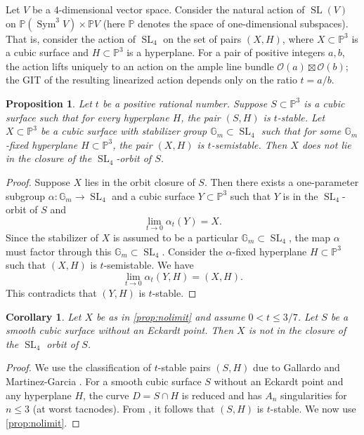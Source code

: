 \documentclass[12 pt]{amsart}
\newtheorem{proposition}{Proposition}[section]
\newtheorem{corollary}{Corollary}[section]
\renewcommand{\P}{\mathbb{P}}
\newcommand{\SL}{\operatorname{SL}}
\newcommand{\<}{\left\langle}
\renewcommand{\>}{\right\rangle}
\DeclareMathOperator{\sym}{Sym}
\begin{document}
Let $V$ be a 4-dimensional vector space.
Consider the natural action of $\SL(V)$ on $\P(\sym^3V) \times \P V$ (here $\P$ denotes the space of one-dimensional subspaces).
That is, consider the action of $\SL_4$ on the set of pairs $(X, H)$, where $X \subset \P^3$ is a cubic surface and $H \subset \P^3$ is a hyperplane.
For a pair of positive integers $a, b$, the action lifts uniquely to an action on the ample line bundle $\mathcal O(a)\boxtimes \mathcal O(b)$; the GIT of the resulting linearized action depends only on the ratio $t = a/b$.

\begin{proposition}\label{prop:nolimit}
  Let $t$ be a positive rational number.
  Suppose $S \subset \P^3$ is a cubic surface such that for every hyperplane $H$, the pair $(S,H)$ is $t$-stable.
  Let $X \subset \P^3$ be a cubic surface with stabilizer group $\mathbb G_m \subset \SL_4$ such that for some $\mathbb G_m$-fixed hyperplane $H \subset \mathbb P^3$, the pair $(X, H)$ is $t$-semistable.
  Then $X$ does not lie in the closure of the $\SL_4$-orbit of $S$.
\end{proposition}
\begin{proof}
  Suppose $X$ lies in the orbit closure of $S$.
  Then there exists a one-parameter subgroup $\alpha \colon \mathbb G_m \to \SL_4$ and a cubic surface $Y \subset \P^3$ such that $Y$ is in the $\SL_4$-orbit of $S$ and
  \[ \lim_{t \to 0} \alpha_t(Y) = X.\]
  Since the stabilizer of $X$ is assumed to be a particular $\mathbb G_m \subset \SL_4$, the map $\alpha$ must factor through this $\mathbb G_m \subset \SL_4$.
  Consider the $\alpha$-fixed hyperplane $H \subset \P^3$ such that $(X, H)$ is $t$-semistable.
  We have
  \[ \lim_{t \to 0} \alpha_t(Y, H) = (X, H).\]
  This contradicts that $(Y, H)$ is $t$-stable.
\end{proof}
\begin{corollary}\label{cor:nolimit}
  Let $X$ be as in \autoref{prop:nolimit} and assume $0 < t \leq 3/7$.
  Let $S$ be a smooth cubic surface without an Eckardt point.
  Then $X$ is not in the closure of the $\SL_4$ orbit of $S$.
\end{corollary}
\begin{proof}
  We use the classification of $t$-stable pairs $(S,H)$ due to Gallardo and Martinez-Garcia \cite{gal.mar:19}.
  For a smooth cubic surface $S$ without an Eckardt point and any hyperplane $H$, the curve $D = S \cap H$ is reduced and has $A_n$ singularities for $n \leq 3$ (at worst tacnodes).
  From \cite[Theorem~2]{gal.mar:19}, it follows that $(S, H)$ is $t$-stable.
  We now use \autoref{prop:nolimit}.
\end{proof}
\end{document}
